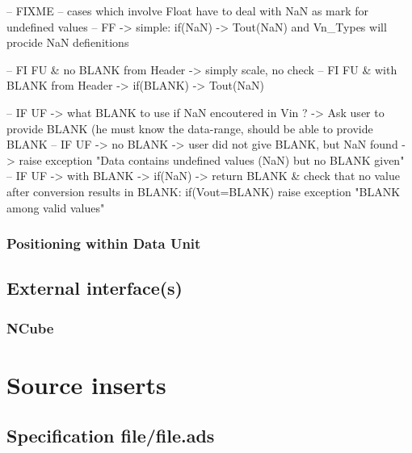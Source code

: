 \documentclass[a4paper,10pt]{article}
\begin{document}
-- FIXME
    -- cases which involve Float have to deal with NaN as mark for undefined values
    -- FF -> simple: if(NaN) -> Tout(NaN) and Vn\_Types will procide NaN defienitions

    -- FI FU \& no   BLANK from Header -> simply scale, no check
    -- FI FU \& with BLANK from Header -> if(BLANK) -> Tout(NaN)

    -- IF UF -> what BLANK to use if NaN encoutered in Vin ? -> Ask user to provide BLANK (he must know the data-range, should be able to provide BLANK
    -- IF UF -> no   BLANK -> user did not give BLANK, but NaN found -> raise exception "Data contains undefined values (NaN) but no BLANK given"
    -- IF UF -> with BLANK -> if(NaN) -> return BLANK \& check that no value after conversion results in BLANK: if(Vout=BLANK) raise exception "BLANK among valid values"





\subsubsection{Positioning within Data Unit}




\subsection{External interface(s)}
\subsubsection{NCube}







\section{Source inserts}


\subsection{Specification file/file.ads}
\inputminted[linenos, fontsize=\footnotesize]{ada}{../lib/src/file/file.ads}
\end{document}
